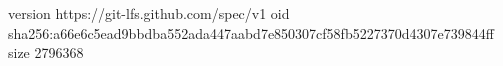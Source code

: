 version https://git-lfs.github.com/spec/v1
oid sha256:a66e6c5ead9bbdba552ada447aabd7e850307cf58fb5227370d4307e739844ff
size 2796368
